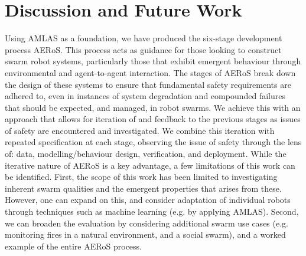 \documentclass[runningheads]{llncs}
\begin{document}
\section{Discussion and Future Work} \label{discussion-conclusions}

Using AMLAS \cite{Hawkins2021} as a foundation, we have produced the six-stage development process AERoS. This process acts as guidance for those looking to construct swarm robot systems, particularly those that exhibit emergent behaviour through environmental and agent-to-agent interaction. The stages of AERoS break down the design of these systems to ensure that fundamental safety requirements are adhered to, even in instances of system degradation and compounded failures that should be expected, and managed, in robot swarms. We achieve this with an approach that allows for iteration of and feedback to the previous stages as issues of safety are encountered and investigated. We combine this iteration with repeated specification at each stage, observing the issue of safety through the lens of: data, modelling/behaviour design, verification, and deployment. 
While the iterative nature of AERoS is a key advantage, a few limitations of this work can be identified. 
First, the scope of this work has been limited to investigating inherent swarm qualities and the emergent properties that arises from these. 
However, one can expand on this, and consider adaptation of individual robots through techniques such as machine learning (e.g. by applying AMLAS).
Second, we can broaden the evaluation by considering additional swarm use cases (e.g. monitoring fires in a natural environment, and a social swarm), and a worked example of the entire AERoS process.


\end{document}
